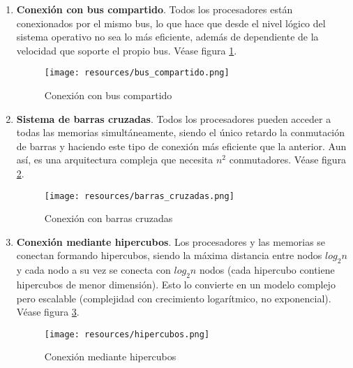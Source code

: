 \documentclass[a4paper, 11pt, titlepage]{article}
\begin{document}
            \begin{enumerate}
                \item \textbf{Conexión con bus compartido}. Todos los procesadores están conexionados por el mismo 
                bus, lo que hace que desde el nivel lógico del sistema operativo no sea lo más eficiente, además 
                de dependiente de la velocidad que soporte el propio bus. Véase figura \ref{bus_compartido}.

                \begin{figure}[htp]
                    \centering
                    \texttt{[image: resources/bus\_compartido.png]}
                    \caption{Conexión con bus compartido}
                    \label{bus_compartido}
                \end{figure}
    
                \item \textbf{Sistema de barras cruzadas}. Todos los procesadores pueden acceder a todas las 
                memorias simultáneamente, siendo el único retardo la conmutación de barras y haciendo este tipo 
                de conexión más eficiente que la anterior. Aun así, es una arquitectura compleja que necesita 
                $n^2$ conmutadores. Véase figura \ref{barras_cruzadas}.

                \begin{figure}[htp]
                    \centering
                    \texttt{[image: resources/barras\_cruzadas.png]}
                    \caption{Conexión con barras cruzadas}
                    \label{barras_cruzadas}
                \end{figure}

                \item \textbf{Conexión mediante hipercubos}. Los procesadores y las memorias se conectan 
                formando hipercubos, siendo la máxima distancia entre nodos $log_2n$ y cada nodo a su vez 
                se conecta con $log_2n$ nodos (cada hipercubo contiene hipercubos de menor dimensión). Esto 
                lo convierte en un modelo complejo pero escalable (complejidad con crecimiento logarítmico, 
                no exponencial). Véase figura \ref{hipercubos}.
                
                \begin{figure}[htp]
                    \centering
                    \texttt{[image: resources/hipercubos.png]}
                    \caption{Conexión mediante hipercubos}
                    \label{hipercubos}
                \end{figure}


\end{enumerate}
\end{document}
